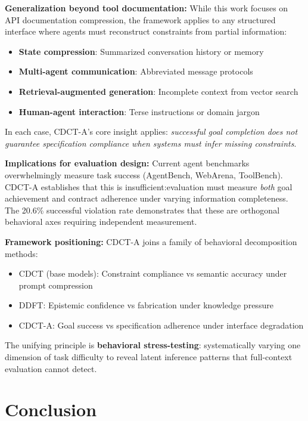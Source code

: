 \documentclass[11pt]{article}
\begin{document}
\textbf{Generalization beyond tool documentation:} While this work focuses on API documentation compression, the framework applies to any structured interface where agents must reconstruct constraints from partial information:
\begin{itemize}
\item \textbf{State compression}: Summarized conversation history or memory
\item \textbf{Multi-agent communication}: Abbreviated message protocols
\item \textbf{Retrieval-augmented generation}: Incomplete context from vector search
\item \textbf{Human-agent interaction}: Terse instructions or domain jargon
\end{itemize}

In each case, CDCT-A's core insight applies: \emph{successful goal completion does not guarantee specification compliance when systems must infer missing constraints}.

\textbf{Implications for evaluation design:} Current agent benchmarks overwhelmingly measure task success (AgentBench, WebArena, ToolBench). CDCT-A establishes that this is insufficient:evaluation must measure \emph{both} goal achievement and contract adherence under varying information completeness. The 20.6\% successful violation rate demonstrates that these are orthogonal behavioral axes requiring independent measurement.

\textbf{Framework positioning:} CDCT-A joins a family of behavioral decomposition methods:
\begin{itemize}
\item CDCT (base models): Constraint compliance vs semantic accuracy under prompt compression
\item DDFT: Epistemic confidence vs fabrication under knowledge pressure  
\item CDCT-A: Goal success vs specification adherence under interface degradation
\end{itemize}

The unifying principle is \textbf{behavioral stress-testing}: systematically varying one dimension of task difficulty to reveal latent inference patterns that full-context evaluation cannot detect.

\section{Conclusion}
\end{document}
